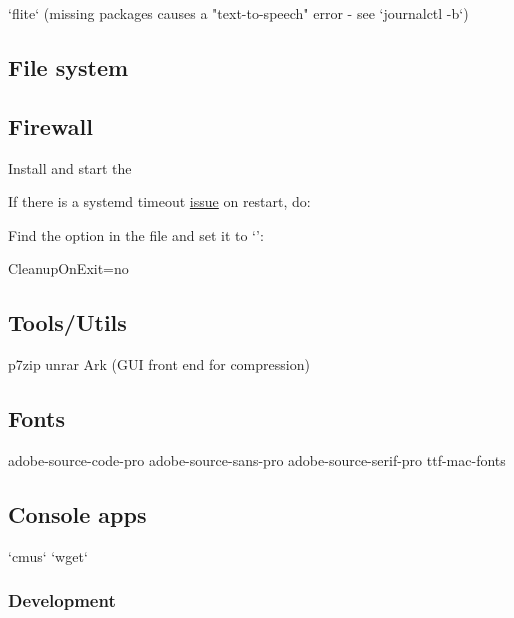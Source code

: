 `flite` (missing packages causes a "text-to-speech" error - see `journalctl -b`)


\subsection{File system}


\subsection{Firewall}

Install  and start the 

If there is a systemd timeout \href{https://bugzilla.redhat.com/show_bug.cgi?id=1294415#c10}{issue} on restart, do:

\begin{blocksection}
    Find the  option in the file and set it to `':\\
    \begin{codeblock}
    	CleanupOnExit=no
    \end{codeblock}
\end{blocksection}

\subsection{Tools/Utils}

p7zip
unrar
Ark (GUI front end for compression)

\subsection{Fonts}

adobe-source-code-pro
adobe-source-sans-pro
adobe-source-serif-pro
ttf-mac-fonts

\subsection{Console apps}

`cmus`
`wget`

\subsubsection{Development}

